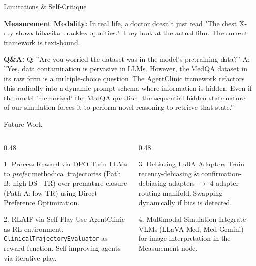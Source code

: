 \begin{frame}{Limitations \& Self-Critique}
{\textbf{Measurement Modality:} In real life, a doctor doesn't just read "The chest X-ray shows bibasilar crackles opacities." They look at the actual film. The current framework is text-bound.

\textbf{Q\&A:}
Q: ''Are you worried the dataset was in the model's pretraining data?''
A: ''Yes, data contamination is pervasive in LLMs. However, the MedQA dataset in its raw form is a multiple-choice question. The AgentClinic framework refactors this radically into a dynamic prompt schema where information is hidden. Even if the model 'memorized' the MedQA question, the sequential hidden-state nature of our simulation forces it to perform novel reasoning to retrieve that state.''
}
\end{frame}

\begin{frame}{Future Work}
\begin{columns}[T]
\begin{column}{0.48\textwidth}
\begin{block}{1. Process Reward via DPO}
\small
Train LLMs to \textit{prefer} methodical trajectories (Path B: high DS+TR) over premature closure (Path A: low TR) using Direct Preference Optimization.
\end{block}
\vspace{0.3em}
\begin{block}{2. RLAIF via Self-Play}
\small
Use AgentClinic as RL environment. \texttt{ClinicalTrajectoryEvaluator} as reward function. Self-improving agents via iterative play.
\end{block}
\end{column}
\begin{column}{0.48\textwidth}
\begin{block}{3. Debiasing LoRA Adapters}
\small
Train recency-debiasing \& confirmation-debiasing adapters $\rightarrow$ 4-adapter routing manifold. Swapping dynamically if bias is detected.
\end{block}
\vspace{0.3em}
\begin{block}{4. Multimodal Simulation}
\small
Integrate VLMs (LLaVA-Med, Med-Gemini) for image interpretation in the Measurement node.
\end{block}
\end{column}
\end{columns}

\end{frame}
